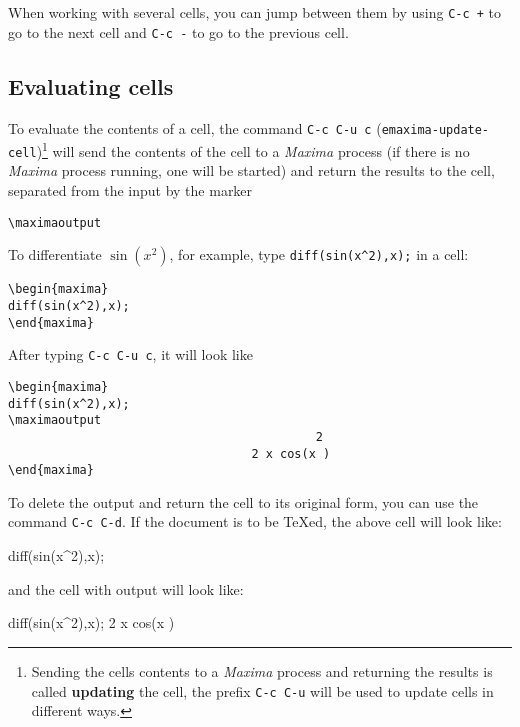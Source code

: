 \documentclass{article}
\newcommand{\mx}{\textsl{\sffamily Maxima}}
\newcommand{\hyph}{-\hspace{0pt}}
\begin{document}
When working with several cells, you can jump between them by using
\texttt{C-c +} to go to the next cell and \texttt{C-c -} to go to the
previous cell.

\subsection{Evaluating cells}

\noindent
To evaluate the contents of a cell, the command
\texttt{C-c C-u c} (\texttt{emaxima\hyph{}update\hyph{}cell})\footnote{Sending the
  cells contents to a \mx{} process and returning the results is
  called \textbf{updating} the cell, the prefix 
\texttt{C-c C-u} will be used to update cells in different ways.} 
will send the contents
of the cell to a \mx{} process (if there is no \mx{} process running,
one will be started) and return the results to the cell,
separated from the input by the marker
\begin{verbatim}
\maximaoutput
\end{verbatim}
\noindent
To differentiate
$\sin(x^2)$, for example, type 
\texttt{diff(sin(x\^{}2),x);} in a cell:
\begin{verbatim}
\begin{maxima}
diff(sin(x^2),x);
\end{maxima}
\end{verbatim}
\noindent
After typing \texttt{C-c C-u c}, it will look like
\begin{verbatim}
\begin{maxima}
diff(sin(x^2),x);
\maximaoutput
                                           2
                                  2 x cos(x )
\end{maxima}
\end{verbatim}
\noindent
To delete the output and return the cell to its original form, you can
use the command \texttt{C-c C-d}.
If the document is to be \TeX{}ed, the above cell will look like:
\newpage
\begin{maxima}
diff(sin(x^2),x);
\end{maxima}
and the cell with output will look like:
\begin{maxima}
diff(sin(x^2),x);
                                  2 x cos(x )
\end{maxima}
\end{document}
